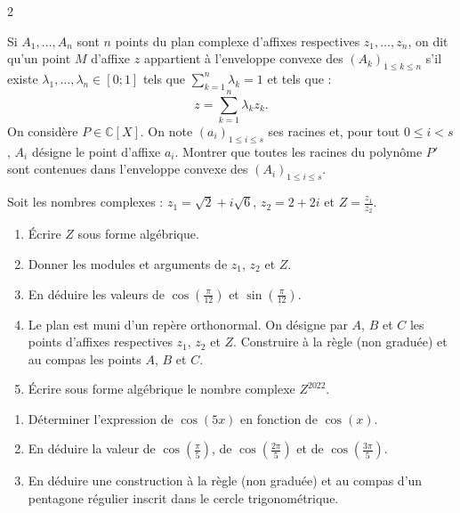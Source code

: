 \documentclass[a4paper,12pt]{article}
\begin{document}
\begin{multicols}{2}
\begin{exercice}[title={Exercice 14 \quad$\star\star\star$\quad\ {[}Représenter, Calculer, Chercher{]}}]{}{}
Si \( A_1, \dots, A_n \) sont \( n \) points du plan complexe d’affixes respectives \( z_1, \dots, z_n \), on dit qu’un point \( M \) d’affixe \( z \) appartient à l’enveloppe convexe des \((A_k)_{1 \leq k \leq n}\) s’il existe \( \lambda_1, \dots, \lambda_n \in [0;1] \) tels que \( \sum_{k=1}^{n} \lambda_k = 1 \) et tels que :
\[
z = \sum_{k=1}^{n} \lambda_k z_k.
\]
On considère \( P \in \mathbb{C}[X] \). On note \( (a_i)_{1 \leq i \leq s} \) ses racines et, pour tout \( 0 \leq i < s \), \( A_i \) désigne le point d’affixe \( a_i \). Montrer que toutes les racines du polynôme \( P' \) sont contenues dans l’enveloppe convexe des \( (A_i)_{1 \leq i \leq s} \).
\end{exercice}

\begin{exercice}[title={Exercice 15 \quad$\star\star$\quad\ {[}Calculer, Représenter{]}}]{}{}
Soit les nombres complexes :
\( z_1 = \sqrt{2} + i\sqrt{6} \), \( z_2 = 2 + 2i \) et \( Z = \frac{z_1}{z_2} \).
\begin{enumerate}
    \item Écrire \( Z \) sous forme algébrique.
    \item Donner les modules et arguments de \( z_1 \), \( z_2 \) et \( Z \).
    \item En déduire les valeurs de \( \cos \left( \frac{\pi}{12} \right) \) et \( \sin \left( \frac{\pi}{12} \right) \).
    \item Le plan est muni d’un repère orthonormal. On désigne par \( A \), \( B \) et \( C \) les points d’affixes respectives \( z_1 \), \( z_2 \) et \( Z \). Construire à la règle (non graduée) et au compas les points \( A \), \( B \) et \( C \).
    \item Écrire sous forme algébrique le nombre complexe \( Z^{2022} \).
\end{enumerate}
\end{exercice}

\begin{exercice}[title={Exercice 16 \quad$\star\star\star$\quad\ [Représenter]}]{}{}
\begin{enumerate}
    \item Déterminer l’expression de \( \cos(5x) \) en fonction de \( \cos(x) \).
    \item En déduire la valeur de \( \cos \left( \frac{\pi}{5} \right) \), de \( \cos \left( \frac{2\pi}{5} \right) \) et de \( \cos \left( \frac{3\pi}{5} \right) \).
    \item En déduire une construction à la règle (non graduée) et au compas d’un pentagone régulier inscrit dans le cercle trigonométrique.
\end{enumerate}
\end{exercice}


\end{multicols}
\end{document}
